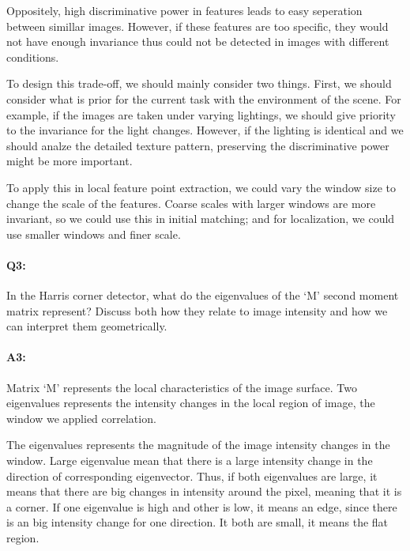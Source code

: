 Oppositely, high discriminative power in features leads to easy seperation between simillar images. However, if these features are too specific, they would not have enough invariance thus could not be detected in images with different conditions.

To design this trade-off, we should mainly consider two things. First, we should consider what is prior for the current task with the environment of the scene. For example, if the images are taken under varying lightings, we should give priority to the invariance for the light changes. However, if the lighting is identical and we should analze the detailed texture pattern, preserving the discriminative power might be more important.

To apply this in local feature point extraction, we could vary the window size to change the scale of the features. Coarse scales with larger windows are more invariant, so we could use this in initial matching; and for localization, we could use smaller windows and finer scale. 

\pagebreak
\paragraph{Q3:} In the Harris corner detector, what do the eigenvalues of the `M' second moment matrix represent? Discuss both how they relate to image intensity and how we can interpret them geometrically.

\paragraph{A3:} Matrix `M' represents the local characteristics of the image surface. Two eigenvalues represents the intensity changes in the local region of image, the window we applied correlation. 

The eigenvalues represents the magnitude of the image intensity changes in the window.
Large eigenvalue mean that there is a large intensity change in the direction of corresponding eigenvector. Thus, if both eigenvalues are large, it means that there are big changes in intensity around the pixel, meaning that it is a corner.
If one eigenvalue is high and other is low, it means an edge, since there is an big intensity change for one direction. It both are small, it means the flat region.





